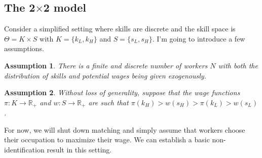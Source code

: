 \documentclass[12 pt]{article}
\newtheorem{assumption}{Assumption} %
\begin{document}
\subsection{The 2$\times$2 model}

Consider a simplified setting where skills are discrete and the skill space is $\Theta = K \times S$ with $K=\{k_L,k_H\}$ and $S=\{s_L,s_H\}$. I'm going to introduce a few assumptions.

\begin{assumption}
	There is a finite and discrete number of workers $N$ with both the distribution of skills and potential wages being given exogenously.
\end{assumption} 

\begin{assumption}
	Without loss of generality, suppose that the wage functions $\pi:K\to\mathbb{R}_+$ and $w:S\to\mathbb{R}_+$ are such that $\pi(k_H) > w(s_H) > \pi(k_L) > w(s_L)$.
	\label{ass:mono}
\end{assumption}

For now, we will shut down matching and simply assume that workers choose their occupation to maximize their wage. We can establish a basic non-identification result in this setting.
\end{document}
